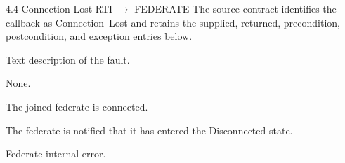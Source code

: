\documentclass[10pt,oneside]{article}
\newcommand{\AcceptanceType}[1]{{\RLMono\fontsize{8.1pt}{9.8pt}\selectfont\color{RLBlueDeep}\mbox{#1}}}
\begin{document}
\begin{HLAServiceContract}{4.4 Connection Lost \textdagger}{RTI $\rightarrow$ FEDERATE}
The source contract identifies the callback as \AcceptanceType{Connection Lost}
and retains the supplied, returned, precondition, postcondition, and exception
entries below.
\begin{HLAServiceContractList}
    \item Text description of the fault.
\end{HLAServiceContractList}
\begin{HLAServiceContractList}
    \item None.
\end{HLAServiceContractList}
\begin{HLAServiceContractList}
    \item The joined federate is connected.
\end{HLAServiceContractList}
\begin{HLAServiceContractList}
    \item The federate is notified that it has entered the Disconnected state.
\end{HLAServiceContractList}
\begin{HLAServiceContractList}
    \item Federate internal error.
\end{HLAServiceContractList}
\end{HLAServiceContract}
\end{document}
